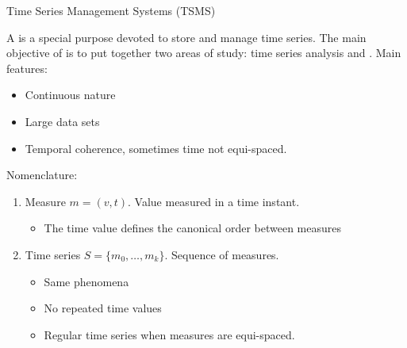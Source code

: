 
\begin{frame}{Time Series Management Systems (TSMS)}

  A  is a special purpose  devoted to store and
  manage time series. The main objective of  is to put
  together two areas of study: time series analysis and .
  Main features:
  \begin{itemize}
  \item Continuous nature
  \item Large data sets
  \item Temporal coherence, sometimes time not equi-spaced.
  \end{itemize}

  Nomenclature:

  \begin{enumerate}

  \item Measure $m=(v,t)$. Value measured in a time instant.
    \begin{itemize}
    \item The time value defines the canonical order between measures
    \end{itemize}

  \item Time series $S=\{m_0,\ldots,m_k\}$. Sequence of measures.
    \begin{itemize}
    \item Same phenomena
    \item No repeated time values
    \item Regular time series when measures are equi-spaced.
    \end{itemize}

  \end{enumerate}

\end{frame}


